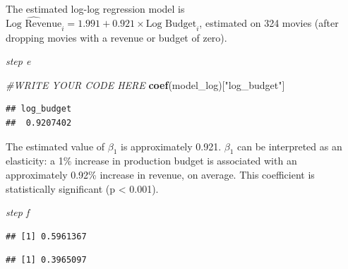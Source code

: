 \documentclass[
]{article}
\newenvironment{Shaded}{\begin{snugshade}}{\end{snugshade}}
\newcommand{\CommentTok}[1]{\textcolor[rgb]{0.56,0.35,0.01}{\textit{#1}}}
\newcommand{\FunctionTok}[1]{\textcolor[rgb]{0.13,0.29,0.53}{\textbf{#1}}}
\newcommand{\NormalTok}[1]{#1}
\newcommand{\SpecialCharTok}[1]{\textcolor[rgb]{0.81,0.36,0.00}{\textbf{#1}}}
\newcommand{\StringTok}[1]{\textcolor[rgb]{0.31,0.60,0.02}{#1}}
\begin{document}
The estimated log-log regression model is
\(\widehat{\text{Log Revenue}}_i = 1.991 + 0.921 \times \text{Log Budget}_i\),
estimated on 324 movies (after dropping movies with a revenue or budget
of zero).

\emph{step e}

\begin{Shaded}
\begin{Highlighting}[]
\CommentTok{\#WRITE YOUR CODE HERE}
\FunctionTok{coef}\NormalTok{(model\_log)[}\StringTok{"log\_budget"}\NormalTok{]}
\end{Highlighting}
\end{Shaded}

\begin{verbatim}
## log_budget 
##  0.9207402
\end{verbatim}

The estimated value of \(\beta_1\) is approximately 0.921. \(\beta_1\)
can be interpreted as an elasticity: a 1\% increase in production budget
is associated with an approximately 0.92\% increase in revenue, on
average. This coefficient is statistically significant (p \textless{}
0.001).

\emph{step f}

\begin{Shaded}
\end{Shaded}

\begin{verbatim}
## [1] 0.5961367
\end{verbatim}

\begin{Shaded}
\end{Shaded}

\begin{verbatim}
## [1] 0.3965097
\end{verbatim}
\end{document}
